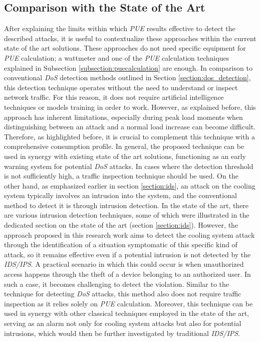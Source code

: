 \subsection{Comparison with the State of the Art}
After explaining the limits within which \emph{PUE} results effective to detect the described attacks, it is useful to contextualize these approaches within the current state of the art solutions. These approaches do not need specific equipment for \emph{PUE} calculation; a wattmeter and one of the \emph{PUE} calculation techniques explained in Subsection \ref{subsection:puecalculation} are enough. In comparison to conventional \emph{DoS} detection methods outlined in Section \ref{section:dos_detection}, this detection technique operates without the need to understand or inspect network traffic. For this reason, it does not require artificial intelligence techniques or models training in order to work. However, as explained before, this approach has inherent limitations, especially during peak load moments when distinguishing between an attack and a normal load increase can become difficult. Therefore, as highlighted before, it is crucial to complement this technique with a comprehensive consumption profile. In general, the proposed technique can be used in synergy with existing state of the art solutions, functioning as an early warning system for potential \emph{DoS} attacks. In cases where the detection threshold is not sufficiently high, a traffic inspection technique should be used. 
On the other hand, as emphasized earlier in section \ref{section:ids}, an attack on the cooling system typically involves an intrusion into the system, and the conventional method to detect it is through intrusion detection. In the state of the art, there are various intrusion detection techniques, some of which were illustrated in the dedicated section on the state of the art (section \ref{section:ids}). However, the approach proposed in this research work aims to detect the cooling system attack through the identification of a situation symptomatic of this specific kind of attack, so it remains effective even if a potential intrusion is not detected by the \emph{IDS/IPS}.
A practical scenario in which this could occur is when unauthorized access happens through the theft of a device belonging to an authorized user. In such a case, it becomes challenging to detect the violation. Similar to the technique for detecting \emph{DoS} attacks, this method also does not require traffic inspection as it relies solely on \emph{PUE} calculation. Moreover, this technique can be used in synergy with other classical techniques employed in the state of the art, serving as an alarm not only for cooling system attacks but also for potential intrusions, which would then be further investigated by traditional \emph{IDS/IPS}.

